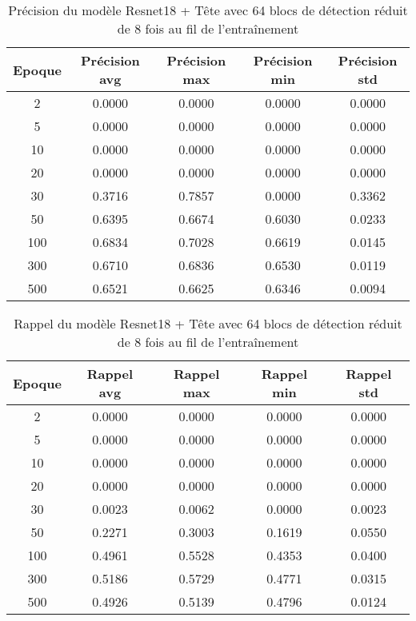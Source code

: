 \begin{table}[!ht]
    \caption{Précision du modèle Resnet18 + Tête avec 64 blocs de détection réduit de 8 fois au fil de l'entraînement}
    \label{tab:resnet18+head_64n_reduced_8x_precision}
    \centering
    \begin{tabular}{ |c||c|c|c|c|  }
        \hline
        \rowcolor{gray!50}
        Epoque & Précision avg & Précision max & Précision min & Précision std\\
        \hline
        2 & 0.0000 & 0.0000 & 0.0000 & 0.0000\\
        5 & 0.0000 & 0.0000 & 0.0000 & 0.0000\\
        10 & 0.0000 & 0.0000 & 0.0000 & 0.0000\\
        20 & 0.0000 & 0.0000 & 0.0000 & 0.0000\\
        30 & 0.3716 & 0.7857 & 0.0000 & 0.3362\\
        50 & 0.6395 & 0.6674 & 0.6030 & 0.0233\\
        100 & 0.6834 & 0.7028 & 0.6619 & 0.0145\\
        300 & 0.6710 & 0.6836 & 0.6530 & 0.0119\\
        500 & 0.6521 & 0.6625 & 0.6346 & 0.0094\\
        \hline
    \end{tabular}
\end{table}

\begin{table}[!ht]
    \caption{Rappel du modèle Resnet18 + Tête avec 64 blocs de détection réduit de 8 fois au fil de l'entraînement}
    \label{tab:resnet18+head_64n_reduced_8x_rappel}
    \centering
    \begin{tabular}{ |c||c|c|c|c|  }
        \hline
        \rowcolor{gray!50}
        Epoque & Rappel avg & Rappel max & Rappel min & Rappel std\\
        \hline
        2 & 0.0000 & 0.0000 & 0.0000 & 0.0000\\
        5 & 0.0000 & 0.0000 & 0.0000 & 0.0000\\
        10 & 0.0000 & 0.0000 & 0.0000 & 0.0000\\
        20 & 0.0000 & 0.0000 & 0.0000 & 0.0000\\
        30 & 0.0023 & 0.0062 & 0.0000 & 0.0023\\
        50 & 0.2271 & 0.3003 & 0.1619 & 0.0550\\
        100 & 0.4961 & 0.5528 & 0.4353 & 0.0400\\
        300 & 0.5186 & 0.5729 & 0.4771 & 0.0315\\
        500 & 0.4926 & 0.5139 & 0.4796 & 0.0124\\
        \hline
    \end{tabular}
\end{table}

